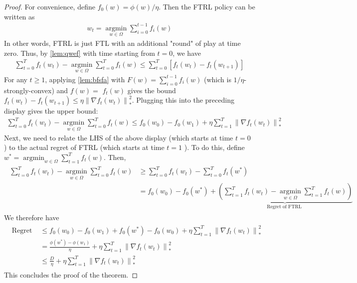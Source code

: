 \documentclass{article}
\begin{document}
\begin{proof}\color{ForestGreen}
  For convenience, define $f_{0}(w)=\phi(w) / \eta$. Then the FTRL policy can be written as
\begin{align*}
w_{t}=\underset{w \in \Omega}{\operatorname{argmin}} \sum_{i=0}^{t-1} f_{i}(w)
\end{align*}
In other words, FTRL is just FTL with an additional "round" of play at time zero. Thus, by \cref{lem:qwef} with time starting from $t=0$, we have
\begin{align*}
\sum_{t=0}^{T} f_{t}\left(w_{t}\right)-\underset{w \in \Omega}{\operatorname{argmin}} \sum_{t=0}^{T} f_{t}(w) \leq \sum_{t=0}^{T}\left[f_{t}\left(w_{t}\right)-f_{t}\left(w_{t+1}\right)\right]
\end{align*}
For any $t \geq 1$, applying \cref{lem:bfsfa} with $F(w)=\sum_{i=0}^{t-1} f_{i}(w)$ (which is $1 / \eta$-strongly-convex) and $f(w)=$ $f_{t}(w)$ gives the bound $f_{t}\left(w_{t}\right)-f_{t}\left(w_{t+1}\right) \leq \eta\left\|\nabla f_{t}\left(w_{t}\right)\right\|_{*}^{2}$. Plugging this into the preceding display gives the upper bound:
\begin{align*}
\sum_{t=0}^{T} f_{t}\left(w_{t}\right)-\underset{w \in \Omega}{\operatorname{argmin}} \sum_{t=0}^{T} f_{t}(w) \leq f_{0}\left(w_{0}\right)-f_{0}\left(w_{1}\right)+\eta \sum_{t=1}^{T}\left\|\nabla f_{t}\left(w_{t}\right)\right\|_{*}^{2}
\end{align*}
Next, we need to relate the LHS of the above display (which starts at time $t=0$ ) to the actual regret of FTRL (which starts at time $t=1$ ). To do this, define $w^{*}=\operatorname{argmin}_{w \in \Omega} \sum_{t=1}^{T} f_{t}(w)$. Then,
\begin{align*}
\begin{aligned}
\sum_{t=0}^{T} f_{t}\left(w_{t}\right)-\underset{w \in \Omega}{\operatorname{argmin}} \sum_{t=0}^{T} f_{t}(w) & \geq \sum_{t=0}^{T} f_{t}\left(w_{t}\right)-\sum_{t=0}^{T} f_{t}\left(w^{*}\right) \\
&=f_{0}\left(w_{0}\right)-f_{0}\left(w^{*}\right)+\underbrace{\left(\sum_{t=1}^{T} f_{t}\left(w_{t}\right)-\underset{w \in \Omega}{\operatorname{argmin}} \sum_{t=1}^{T} f_{t}(w)\right)}_{\text {Regret of FTRL }}
\end{aligned}
\end{align*}
We therefore have
\begin{align*}
\begin{aligned}
\text { Regret of FTRL } & \leq f_{0}\left(w_{0}\right)-f_{0}\left(w_{1}\right)+f_{0}\left(w^{*}\right)-f_{0}\left(w_{0}\right)+\eta \sum_{t=1}^{T}\left\|\nabla f_{t}\left(w_{t}\right)\right\|_{*}^{2} \\
&=\frac{\phi\left(w^{*}\right)-\phi\left(w_{1}\right)}{\eta}+\eta \sum_{t=1}^{T}\left\|\nabla f_{t}\left(w_{t}\right)\right\|_{*}^{2} \\
& \leq \frac{D}{\eta}+\eta \sum_{t=1}^{T}\left\|\nabla f_{t}\left(w_{t}\right)\right\|_{*}^{2}
\end{aligned}
\end{align*}
This concludes the proof of the theorem.
\end{proof}
\end{document}

